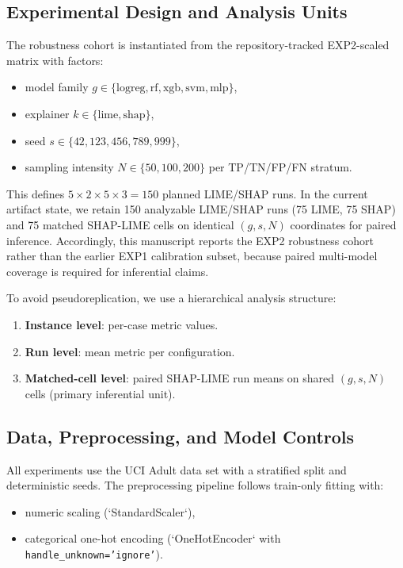 \documentclass[twoside,11pt]{article}
\begin{document}
\subsection{Experimental Design and Analysis Units}
The robustness cohort is instantiated from the repository-tracked
EXP2-scaled matrix with factors:
\begin{itemize}[leftmargin=*]
\item model family \(g \in \{\mathrm{logreg}, \mathrm{rf}, \mathrm{xgb},
\mathrm{svm}, \mathrm{mlp}\}\),
\item explainer \(k \in \{\mathrm{lime}, \mathrm{shap}\}\),
\item seed \(s \in \{42, 123, 456, 789, 999\}\),
\item sampling intensity \(N \in \{50, 100, 200\}\) per TP/TN/FP/FN stratum.
\end{itemize}

This defines \(5 \times 2 \times 5 \times 3 = 150\) planned LIME/SHAP
runs. In the current artifact state, we retain 150 analyzable LIME/SHAP
runs (75 LIME, 75 SHAP) and 75 matched SHAP-LIME cells on identical
\((g,s,N)\) coordinates for paired inference.
Accordingly, this manuscript reports the EXP2 robustness cohort rather
than the earlier EXP1 calibration subset, because paired multi-model
coverage is required for inferential claims.

To avoid pseudoreplication, we use a hierarchical analysis structure:
\begin{enumerate}[leftmargin=*]
\item \textbf{Instance level}: per-case metric values.
\item \textbf{Run level}: mean metric per configuration.
\item \textbf{Matched-cell level}: paired SHAP-LIME run means on shared
\((g,s,N)\) cells (primary inferential unit).
\end{enumerate}

\subsection{Data, Preprocessing, and Model Controls}
All experiments use the UCI Adult data set \citep{kohavi1996scaling} with a
stratified split and deterministic seeds. The preprocessing pipeline
follows train-only fitting with:
\begin{itemize}[leftmargin=*]
\item numeric scaling (`StandardScaler`),
\item categorical one-hot encoding (`OneHotEncoder` with
\texttt{handle\_unknown='ignore'}).
\end{itemize}
\end{document}
